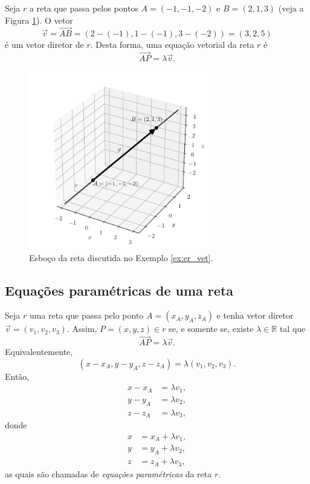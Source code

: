 \begin{ex}\label{ex:er_vet}
  Seja $r$ a reta que passa pelos pontos $A=(-1,-1,-2)$ e $B = (2,1,3)$ (veja a Figura \ref{fig:ex_er_vet}). O vetor
  \begin{equation}
    \vec{v} = \overrightarrow{AB} = (2-(-1),1-(-1),3-(-2)) = (3,2,5)
  \end{equation}
  é um vetor diretor de $r$. Desta forma, uma equação vetorial da reta $r$ é
  \begin{equation}
    \overrightarrow{AP} = \lambda\vec{v}.
  \end{equation}
  \begin{figure}[H]
    \centering
    \includegraphics[width=0.7\textwidth]{./cap_erp/dados/fig_ex_er_vet/fig_ex_er_vet}
    \caption{Esboço da reta discutida no Exemplo \ref{ex:er_vet}.}
    \label{fig:ex_er_vet}
  \end{figure}  
\end{ex}

\subsection{Equações paramétricas de uma reta}

Seja $r$ uma reta que passa pelo ponto $A = (x_A,y_A,z_A)$ e tenha vetor diretor $\vec{v} = (v_1,v_2,v_3)$. Assim, $P = (x,y,z)\in r$ se, e somente se, existe $\lambda\in\mathbb{R}$ tal que
\begin{equation}
  \overrightarrow{AP} = \lambda\vec{v}.
\end{equation}
Equivalentemente,
\begin{equation}
  (x-x_A,y-y_A,z-z_A) = \lambda (v_1,v_2,v_3).
\end{equation}
Então,
\begin{align}
  x-x_A &= \lambda v_1,\\
  y-y_A &= \lambda v_2,\\
  z-z_A &= \lambda v_3,
\end{align}
donde
\begin{align}
  x &= x_A + \lambda v_1,\\
  y &= y_A + \lambda v_2,\\
  z &= z_A + \lambda v_3,
\end{align}
as quais são chamadas de \emph{equações paramétricas} da reta $r$.

